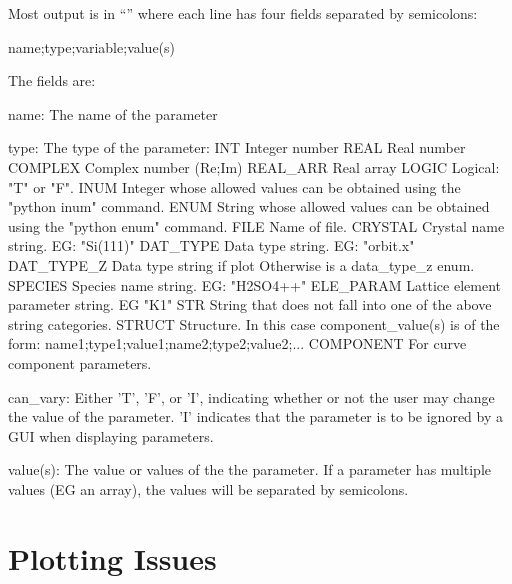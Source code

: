 Most output is in ``'' where each line has four fields separated by semicolons:
\begin{example}
  {name};{type};{variable};{value(s)}
\end{example}
The fields are:
\begin{example}
    name:       The name of the parameter

    type:       The type of the parameter:
        INT           Integer number
        REAL          Real number
        COMPLEX       Complex number (Re;Im)
        REAL_ARR      Real array
        LOGIC         Logical: "T" or "F".
        INUM          Integer whose allowed values can be obtained 
                        using the "python inum" command.
        ENUM          String whose allowed values can be obtained 
                        using the "python enum" command.
        FILE          Name of file.
        CRYSTAL       Crystal name string. EG: "Si(111)"
        DAT_TYPE      Data type string. EG: "orbit.x"
        DAT_TYPE_Z    Data type string if plot%
                        Otherwise is a data_type_z enum.
        SPECIES       Species name string. EG: "H2SO4++"
        ELE_PARAM     Lattice element parameter string. EG "K1"
        STR           String that does not fall into one of the above string categories.
        STRUCT        Structure. In this case {component_value(s)} is of the form:
                        {name1};{type1};{value1};{name2};{type2};{value2};...
        COMPONENT     For curve component parameters.

    can_vary:   Either 'T', 'F', or 'I', indicating whether or not the
                user may change the value of the parameter. 'I' indicates
                that the parameter is to be ignored by a GUI when displaying parameters.

    value(s):   The value or values of the the parameter. If a parameter has multiple
                values (EG an array), the values will be separated by semicolons.
\end{example}

\section{Plotting Issues}
\label{s:gui.plot}

